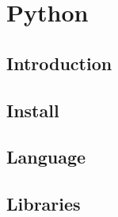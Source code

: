 

\part{Python}
\label{p:python}

\chapter{Introduction}
\label{C:python}

\FILENAME



\chapter{Install}
\label{C:python-install}





\chapter{Language}
\label{C:python-language}



\chapter{Libraries}
\label{C:python-lib}






